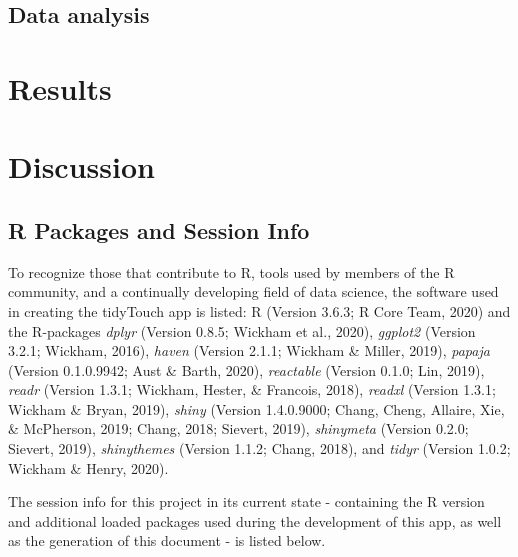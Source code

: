 \documentclass[english,man,floatsintext]{apa6}
\begin{document}
\hypertarget{data-analysis}{%
\subsection{Data analysis}\label{data-analysis}}

\hypertarget{results}{%
\section{Results}\label{results}}

\hypertarget{discussion}{%
\section{Discussion}\label{discussion}}

\hypertarget{r-packages-and-session-info}{%
\subsection{R Packages and Session Info}\label{r-packages-and-session-info}}

To recognize those that contribute to R, tools used by members of the R community, and a continually developing field of data science, the software used in creating the tidyTouch app is listed: R (Version 3.6.3; R Core Team, 2020) and the R-packages \emph{dplyr} (Version 0.8.5; Wickham et al., 2020), \emph{ggplot2} (Version 3.2.1; Wickham, 2016), \emph{haven} (Version 2.1.1; Wickham \& Miller, 2019), \emph{papaja} (Version 0.1.0.9942; Aust \& Barth, 2020), \emph{reactable} (Version 0.1.0; Lin, 2019), \emph{readr} (Version 1.3.1; Wickham, Hester, \& Francois, 2018), \emph{readxl} (Version 1.3.1; Wickham \& Bryan, 2019), \emph{shiny} (Version 1.4.0.9000; Chang, Cheng, Allaire, Xie, \& McPherson, 2019; Chang, 2018; Sievert, 2019), \emph{shinymeta} (Version 0.2.0; Sievert, 2019), \emph{shinythemes} (Version 1.1.2; Chang, 2018), and \emph{tidyr} (Version 1.0.2; Wickham \& Henry, 2020).

The session info for this project in its current state - containing the R version and additional loaded packages used during the development of this app, as well as the generation of this document - is listed below.
\end{document}
